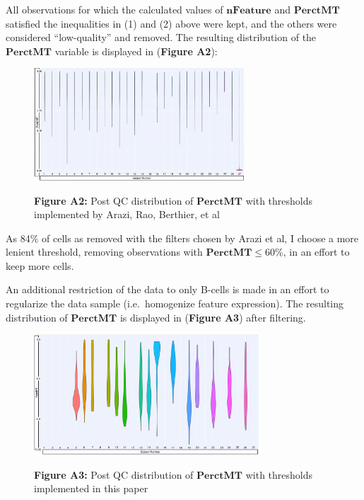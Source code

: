 \documentclass[12pt,]{article}
\begin{document}
All observations for which the calculated values of
\(\mathbf{nFeature}\) and \(\mathbf{PerctMT}\) satisfied the
inequalities in (1) and (2) above were kept, and the others were
considered ``low-quality'' and removed. The resulting distribution of
the \(\mathbf{PerctMT}\) variable is displayed in (\textbf{Figure A2}):

\begin{figure}[!h]
\centering
        \includegraphics[width=0.7\textwidth]{fig2.jpeg}
\vspace{5pt}
\begin{center}
\textbf{Figure A2:} Post QC distribution of $\mathbf{PerctMT}$ with thresholds implemented by Arazi, Rao, Berthier, et al
\end{center}
\end{figure}

As 84\% of cells as removed with the filters chosen by Arazi et al, I
choose a more lenient threshold, removing observations with
\(\mathbf{PerctMT} \leq 60 \%\), in an effort to keep more cells.

An additional restriction of the data to only B-cells is made in an
effort to regularize the data sample (i.e.~homogenize feature
expression). The resulting distribution of \(\mathbf{PerctMT}\) is
displayed in (\textbf{Figure A3}) after filtering.

\begin{figure}[!h]
\centering
        \includegraphics[width=0.75\textwidth]{fig3.jpeg}
\vspace{5pt}
\begin{center}
\textbf{Figure A3:} Post QC distribution of $\mathbf{PerctMT}$ with thresholds implemented in this paper
\end{center}
\end{figure}
\end{document}
